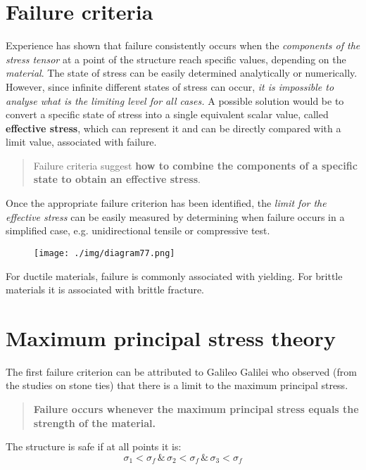 \section{Failure criteria}
Experience has shown that failure consistently occurs when the \textit{components of the stress tensor} at a point of the structure reach specific values, depending on the \textit{material}. The state of stress can be easily determined analytically or numerically. However, since infinite different states of stress can occur, \textit{it is impossible to analyse what is the limiting level for all cases.} A possible solution would be to convert a specific state of stress into a single equivalent scalar value, called \textbf{effective stress}, which can represent it and can be  directly compared with a limit value, associated with failure.
\begin{quotation}
  Failure criteria suggest \textbf{how to combine the components of a specific state to obtain an effective stress}.
\end{quotation}
Once the appropriate failure criterion has been identified, the \textit{limit for the effective stress} can be easily measured by determining when failure occurs in a simplified case, e.g. unidirectional tensile or compressive test.
\begin{figure}[H]
  \centering
  \texttt{[image: ./img/diagram77.png]}
  \caption{}
\end{figure}
For ductile materials, failure is commonly associated with yielding. For brittle materials it is associated with brittle fracture.
\section{Maximum principal stress theory}
The first failure criterion can be attributed to Galileo Galilei who observed (from the studies on stone ties) that there is a limit to the maximum principal stress.
\begin{quotation}
  \textbf{Failure occurs whenever the maximum principal stress equals the strength of the material.}
\end{quotation}
The structure is safe if at all points it is:
\begin{equation}
  \sigma_1 < \sigma_f \, \& \, \sigma_2 < \sigma_f \, \& \, \sigma_3 < \sigma_f
\end{equation}
